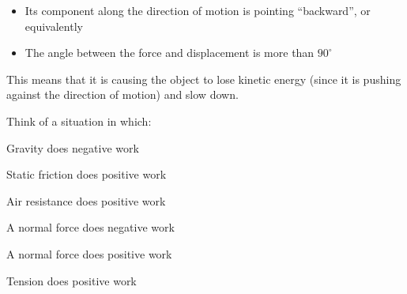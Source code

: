 \documentclass[12pt]{article}
\begin{document}
\begin{itemize}
	\item Its component along the direction of motion is pointing ``backward'', or equivalently
	\item The angle between the force and displacement is more than $90^\circ$
\end{itemize}

This means that it is causing the object to lose kinetic energy (since it is pushing against the direction of motion) and slow down.


\newpage

Think of a situation in which:

\vspace{0.3in}


\begin{minipage}{0.5\textwidth}	
	\begin{center}
		Gravity does negative work
	\end{center}
\end{minipage}
\begin{minipage}{0.5\textwidth}	
		\begin{center}
	Static friction does positive work
		\end{center}
\end{minipage}


\vspace{1.2in}


\begin{minipage}{0.5\textwidth}	
		\begin{center}
	Air resistance does positive work
		\end{center}
\end{minipage}
\begin{minipage}{0.5\textwidth}	
		\begin{center}
	A normal force does negative work
		\end{center}
\end{minipage}


\vspace{1.2in}


\begin{minipage}{0.5\textwidth}	
		\begin{center}
	A normal force does positive work
		\end{center}
\end{minipage}
\begin{minipage}{0.5\textwidth}	
		\begin{center}
	Tension does positive work
		\end{center}
\end{minipage}
\end{document}
